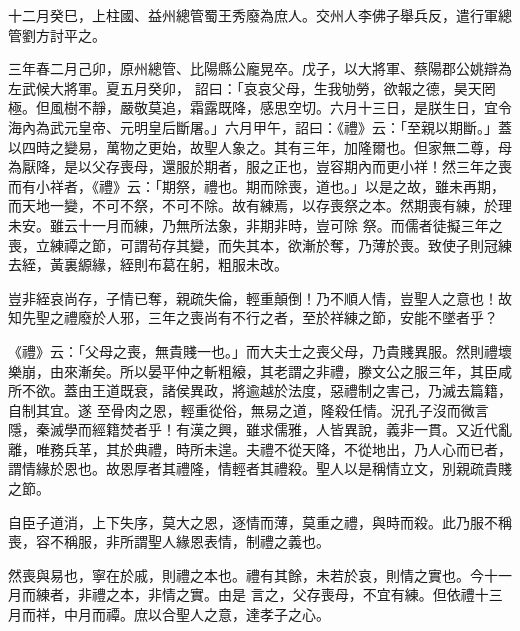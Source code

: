 \begin{pinyinscope}
 十二月癸巳，上柱國、益州總管蜀王秀廢為庶人。交州人李佛子舉兵反，遣行軍總管劉方討平之。



 三年春二月己卯，原州總管、比陽縣公龐晃卒。戊子，以大將軍、蔡陽郡公姚辯為左武候大將軍。夏五月癸卯，
 詔曰：「哀哀父母，生我劬勞，欲報之德，昊天罔極。但風樹不靜，嚴敬莫追，霜露既降，感思空切。六月十三日，是朕生日，宜令海內為武元皇帝、元明皇后斷屠。」六月甲午，詔曰：《禮》云：「至親以期斷。」蓋以四時之變易，萬物之更始，故聖人象之。其有三年，加隆爾也。但家無二尊，母為厭降，是以父存喪母，還服於期者，服之正也，豈容期內而更小祥！然三年之喪而有小祥者，《禮》云：「期祭，禮也。期而除喪，道也。」以是之故，雖未再期，而天地一變，不可不祭，不可不除。故有練焉，以存喪祭之本。然期喪有練，於理未安。雖云十一月而練，乃無所法象，非期非時，豈可除
 祭。而儒者徒擬三年之喪，立練禫之節，可謂茍存其變，而失其本，欲漸於奪，乃薄於喪。致使子則冠練去絰，黃裏縓緣，絰則布葛在躬，粗服未改。



 豈非絰哀尚存，子情已奪，親疏失倫，輕重顛倒！乃不順人情，豈聖人之意也！故知先聖之禮廢於人邪，三年之喪尚有不行之者，至於祥練之節，安能不墜者乎？



 《禮》云：「父母之喪，無貴賤一也。」而大夫士之喪父母，乃貴賤異服。然則禮壞樂崩，由來漸矣。所以晏平仲之斬粗縗，其老謂之非禮，滕文公之服三年，其臣咸所不欲。蓋由王道既衰，諸侯異政，將逾越於法度，惡禮制之害己，乃滅去篇籍，自制其宜。遂
 至骨肉之恩，輕重從俗，無易之道，隆殺任情。況孔子沒而微言隱，秦滅學而經籍焚者乎！有漢之興，雖求儒雅，人皆異說，義非一貫。又近代亂離，唯務兵革，其於典禮，時所未遑。夫禮不從天降，不從地出，乃人心而已者，謂情緣於恩也。故恩厚者其禮隆，情輕者其禮殺。聖人以是稱情立文，別親疏貴賤之節。



 自臣子道消，上下失序，莫大之恩，逐情而薄，莫重之禮，與時而殺。此乃服不稱喪，容不稱服，非所謂聖人緣恩表情，制禮之義也。



 然喪與易也，寧在於戚，則禮之本也。禮有其餘，未若於哀，則情之實也。今十一月而練者，非禮之本，非情之實。由是
 言之，父存喪母，不宜有練。但依禮十三月而祥，中月而禫。庶以合聖人之意，達孝子之心。




\end{pinyinscope}
